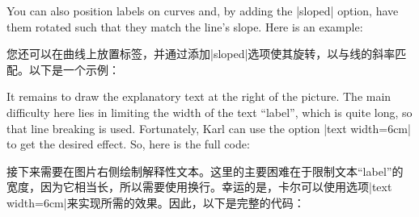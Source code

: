 You can also position labels on curves and, by adding the |sloped| option, have
them rotated such that they match the line's slope. Here is an example:

您还可以在曲线上放置标签，并通过添加|sloped|选项使其旋转，以与线的斜率匹配。以下是一个示例：

\begin{codeexample}[]
\end{codeexample}

It remains to draw the explanatory text at the right of the picture. The main
difficulty here lies in limiting the width of the text ``label'', which is
quite long, so that line breaking is used. Fortunately, Karl can use the option
|text width=6cm| to get the desired effect. So, here is the full code:

接下来需要在图片右侧绘制解释性文本。这里的主要困难在于限制文本“label”的宽度，因为它相当长，所以需要使用换行。幸运的是，卡尔可以使用选项|text width=6cm|来实现所需的效果。因此，以下是完整的代码：


